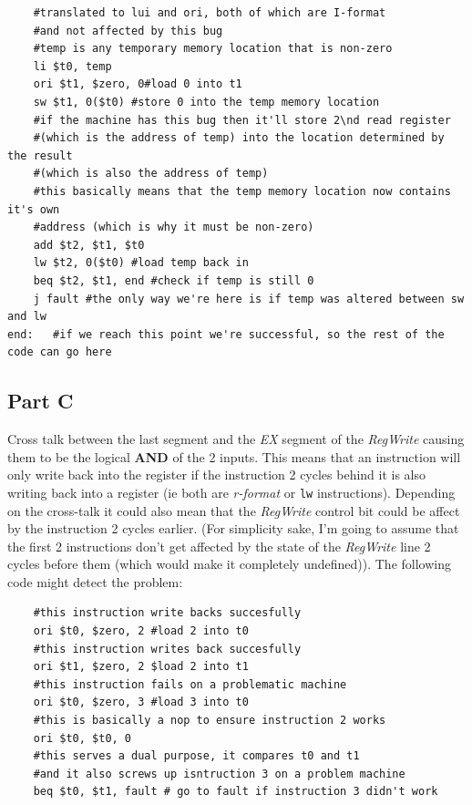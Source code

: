 \documentclass[11pt]{article} %
\newcommand{\strong}[1]{\textbf{#1}}
\newcommand{\code}[1]{\texttt{#1}}
\newcommand{\nd}{$^{\text{nd}\ }$}
\begin{document}
\begin{verbatim}
    #translated to lui and ori, both of which are I-format 
    #and not affected by this bug
    #temp is any temporary memory location that is non-zero
    li $t0, temp 
    ori $t1, $zero, 0#load 0 into t1
    sw $t1, 0($t0) #store 0 into the temp memory location
    #if the machine has this bug then it'll store 2\nd read register 
    #(which is the address of temp) into the location determined by the result 
    #(which is also the address of temp)
    #this basically means that the temp memory location now contains it's own 
    #address (which is why it must be non-zero)
    add $t2, $t1, $t0 
    lw $t2, 0($t0) #load temp back in
    beq $t2, $t1, end #check if temp is still 0
    j fault #the only way we're here is if temp was altered between sw and lw
end:   #if we reach this point we're successful, so the rest of the code can go here
\end{verbatim}

\subsection{Part C}

Cross talk between the last segment and the \emph{EX} segment of the \emph{RegWrite} causing them to be the logical \strong{AND} of the 2 inputs. This means that an instruction will only write back into the register if the instruction 2 cycles behind it is also writing back into a register (ie both are \emph{r-format} or \code{lw} instructions). Depending on the cross-talk it could also mean that the \emph{RegWrite} control bit could be affect by the instruction 2 cycles earlier. (For simplicity sake, I'm going to assume that the first 2 instructions don't get affected by the state of the \emph{RegWrite} line 2 cycles before them (which would make it completely undefined)). The following code might detect the problem:

\begin{verbatim}
    #this instruction write backs succesfully
    ori $t0, $zero, 2 #load 2 into t0
    #this instruction writes back succesfully
    ori $t1, $zero, 2 $load 2 into t1
    #this instruction fails on a problematic machine
    ori $t0, $zero, 3 #load 3 into t0
    #this is basically a nop to ensure instruction 2 works
    ori $t0, $t0, 0
    #this serves a dual purpose, it compares t0 and t1
    #and it also screws up isntruction 3 on a problem machine
    beq $t0, $t1, fault # go to fault if instruction 3 didn't work
\end{verbatim}
\end{document}
